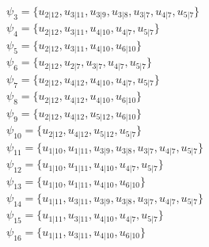 \documentclass[12pt,a4paper]{report}
\begin{document}
$\psi_{3} = \{u_{2 | 12},u_{3 | 11},u_{3 | 9},u_{3 | 8},u_{3 | 7},u_{4 | 7},u_{5 | 7}\}$ \\
$\psi_{4} = \{u_{2 | 12},u_{3 | 11},u_{4 | 10},u_{4 | 7},u_{5 | 7}\}$ \\
$\psi_{5} = \{u_{2 | 12},u_{3 | 11},u_{4 | 10},u_{6 | 10}\}$ \\
$\psi_{6} = \{u_{2 | 12},u_{2 | 7},u_{3 | 7},u_{4 | 7},u_{5 | 7}\}$ \\
$\psi_{7} = \{u_{2 | 12},u_{4 | 12},u_{4 | 10},u_{4 | 7},u_{5 | 7}\}$ \\
$\psi_{8} = \{u_{2 | 12},u_{4 | 12},u_{4 | 10},u_{6 | 10}\}$ \\
$\psi_{9} = \{u_{2 | 12},u_{4 | 12},u_{5 | 12},u_{6 | 10}\}$ \\
$\psi_{10} = \{u_{2 | 12},u_{4 | 12},u_{5 | 12},u_{5 | 7}\}$ \\
$\psi_{11} = \{u_{1 | 10},u_{1 | 11},u_{3 | 9},u_{3 | 8},u_{3 | 7},u_{4 | 7},u_{5 | 7}\}$ \\
$\psi_{12} = \{u_{1 | 10},u_{1 | 11},u_{4 | 10},u_{4 | 7},u_{5 | 7}\}$ \\
$\psi_{13} = \{u_{1 | 10},u_{1 | 11},u_{4 | 10},u_{6 | 10}\}$ \\
$\psi_{14} = \{u_{1 | 11},u_{3 | 11},u_{3 | 9},u_{3 | 8},u_{3 | 7},u_{4 | 7},u_{5 | 7}\}$ \\
$\psi_{15} = \{u_{1 | 11},u_{3 | 11},u_{4 | 10},u_{4 | 7},u_{5 | 7}\}$ \\
$\psi_{16} = \{u_{1 | 11},u_{3 | 11},u_{4 | 10},u_{6 | 10}\}$ \\
\end{document}
